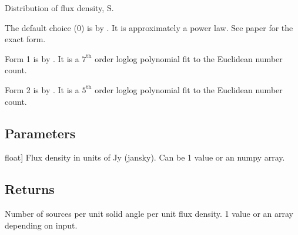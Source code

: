 \documentclass[letterpaper,10pt,english]{sphinxmanual}
\begin{document}
\begin{fulllineitems}
\begin{fulllineitems}
\sphinxAtStartPar
Distribution of flux density, S.

\sphinxAtStartPar
The default choice (0) is by . It is approximately a power law. See paper for the exact form.

\sphinxAtStartPar
Form 1 is by . It is a \(7^{\mathrm{th}}\) order log\sphinxhyphen{}log polynomial fit to the Euclidean number count.

\sphinxAtStartPar
Form 2 is by . It is a \(5^{\mathrm{th}}\) order log\sphinxhyphen{}log polynomial fit to the Euclidean number count.


\subsection{Parameters}
\label{\detokenize{api:id4}}\begin{description}
\sphinxlineitem{S}{[}float{]}
\sphinxAtStartPar
Flux density in units of Jy (jansky). Can be 1 value or an numpy array.

\end{description}


\subsection{Returns}
\label{\detokenize{api:id5}}\begin{description}
\sphinxAtStartPar
Number of sources per unit solid angle per unit flux density. 1 value or an array depending on input.

\end{description}

\end{fulllineitems}



\end{fulllineitems}
\end{document}
